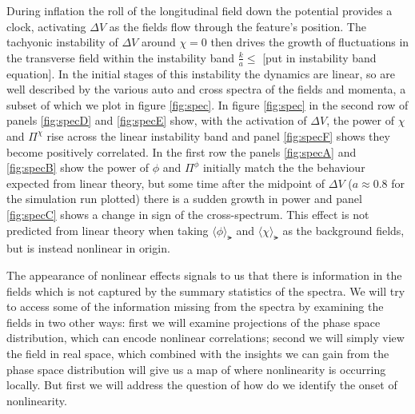 During inflation the roll of the longitudinal field down the potential provides a clock, activating $\Delta V$ as the fields flow through the feature's position.
The tachyonic instability of $\Delta V$ around $\chi=0$ then drives the growth of fluctuations in the transverse field within the instability band $\frac{k}{a} \leq $ [put in instability band equation].
In the initial stages of this instability the dynamics are linear, so are well described by the various auto and cross spectra of the fields and momenta, a subset of which we plot in figure \ref{fig:spec}.
In figure \ref{fig:spec} in the second row of panels \ref{fig:specD} and \ref{fig:specE} show, with the activation of $\Delta V$, the power of $\chi$ and $\Pi^\chi$ rise across the linear instability band and panel \ref{fig:specF} shows they become positively correlated.
In the first row the panels \ref{fig:specA} and \ref{fig:specB} show the power of $\phi$ and $\Pi^\phi$ initially match the the behaviour expected from linear theory, but some time after the midpoint of $\Delta V$ ($a \approx 0.8$ for the simulation run plotted) there is a sudden growth in power and panel \ref{fig:specC} shows a change in sign of the cross-spectrum.
This effect is not predicted from linear theory when taking $\langle \phi \rangle_\lat$ and $\langle \chi \rangle_\lat$ as the background fields, but is instead nonlinear in origin.

\Fspec

\Fspecdet

The appearance of nonlinear effects signals to us that there is information in the fields which is not captured by the summary statistics of the spectra.
We will try to access some of the information missing from the spectra by examining the fields in two other ways: first we will examine projections of the phase space distribution, which can encode nonlinear correlations; second we will simply view the field in real space, which combined with the insights we can gain from the phase space distribution will give us a map of where nonlinearity is occurring locally.
But first we will address the question of how do we identify the onset of nonlinearity.


